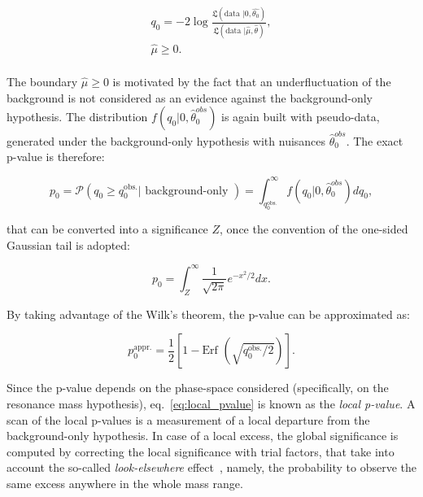 \begin{equation}
\begin{gathered}
{q}_{0} = -2 \log { \frac{\mathfrak{L} (\text{data }| 0, \hat{\theta_{0}}) }{ \mathfrak{L} (\text{data }| \hat{\mu}, \hat{\theta})  } },\\
\hat{\mu} \geq 0.\\
\end{gathered}
\end{equation}

\noindent The boundary $\hat{\mu} \geq 0$ is motivated by the fact that an underfluctuation of the background is not considered as an evidence against the background-only hypothesis. The distribution $f (q_0 | 0, \hat{\theta}_0^{obs})$ is again built with pseudo-data, generated under the background-only hypothesis with nuisances $\hat{\theta}_0^{obs}$. The exact p-value is therefore:

\begin{equation}
p_0 = \mathcal{P} \left( q_0 \geq q_0^{\text{obs.}} | \text{ background-only } \right) = \int_{q_0^{\text{obs.}}}^{\infty} f (q_0 | 0, \hat{\theta}_0^{obs}) d q_0,
\label{eq:local_pvalue}
\end{equation}

\noindent that can be converted into a significance $Z$, once the convention of the one-sided Gaussian tail is adopted:

\begin{equation}
p_0 = \int_Z^{\infty} \frac{1}{\sqrt{2 \pi}} e^{-x^2/2} dx.
\end{equation} 

\noindent By taking advantage of the Wilk's theorem, the p-value can be approximated as:

\begin{equation}
p_0^{\text{appr.}} = \frac{1}{2} \left[ 1 - \text{Erf } \left( \sqrt{q_0^{\text{obs.}}/2}\right) \right].
\end{equation} 

\noindent Since the p-value depends on the phase-space considered (specifically, on the resonance mass hypothesis), eq.~\ref{eq:local_pvalue} is known as the \emph{local p-value}. A scan of the local p-values is a measurement of a local departure from the background-only hypothesis. In case of a local excess, the global significance is computed by correcting the local significance with trial factors, that take into account the so-called \emph{look-elsewhere} effect~\cite{Gross2010}, namely, the probability to observe the same excess anywhere in the whole mass range.

